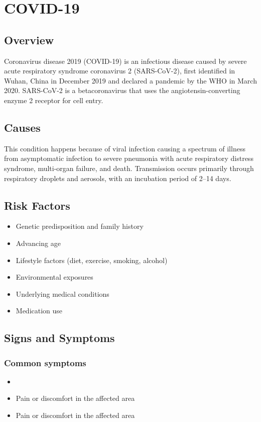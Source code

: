 \chapter{COVID-19}
\label{sec:COVID-19}

\section{Overview}
Coronavirus disease 2019 (COVID-19) is an infectious disease caused by severe acute respiratory syndrome coronavirus 2 (SARS-CoV-2), first identified in Wuhan, China in December 2019 and declared a pandemic by the WHO in March 2020. SARS-CoV-2 is a betacoronavirus that uses the angiotensin-converting enzyme 2 receptor for cell entry.
\section{Causes}
This condition happens because of viral infection causing a spectrum of illness from asymptomatic infection to severe pneumonia with acute respiratory distress syndrome, multi-organ failure, and death. Transmission occurs primarily through respiratory droplets and aerosols, with an incubation period of 2--14 days.     
\section{Risk Factors}

\begin{itemize}[noitemsep]
  \item Genetic predisposition and family history
  \item Advancing age
  \item Lifestyle factors (diet, exercise, smoking, alcohol)
  \item Environmental exposures
  \item Underlying medical conditions
  \item Medication use
\end{itemize}
\section{Signs and Symptoms}

\subsection{Common symptoms}
\begin{itemize}[noitemsep]
  \item \item Pain or discomfort in the affected area    \item Pain or discomfort in the affected area
  \end{itemize}

